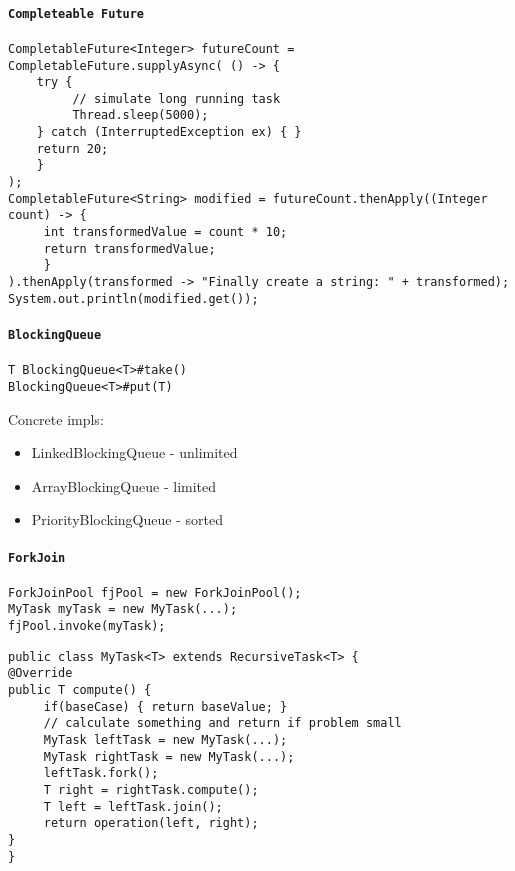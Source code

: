 \paragraph{\texttt{Completeable Future}}
\begin{verbatim}
CompletableFuture<Integer> futureCount = CompletableFuture.supplyAsync( () -> {
    try {
         // simulate long running task 
         Thread.sleep(5000);
    } catch (InterruptedException ex) { }
    return 20; 
    }
);
CompletableFuture<String> modified = futureCount.thenApply((Integer count) -> {
     int transformedValue = count * 10;
     return transformedValue; 
     }
).thenApply(transformed -> "Finally create a string: " + transformed);
System.out.println(modified.get());
\end{verbatim}


\paragraph{\texttt{BlockingQueue}}
\begin{verbatim}
T BlockingQueue<T>#take()
BlockingQueue<T>#put(T)
\end{verbatim}
Concrete impls:
\begin{itemize}
	\item LinkedBlockingQueue - unlimited
	\item ArrayBlockingQueue - limited
	\item PriorityBlockingQueue - sorted
\end{itemize}

\paragraph{\texttt{ForkJoin}}
\begin{verbatim}
ForkJoinPool fjPool = new ForkJoinPool();
MyTask myTask = new MyTask(...);
fjPool.invoke(myTask);
\end{verbatim}
\begin{verbatim}
public class MyTask<T> extends RecursiveTask<T> {
@Override
public T compute() {
     if(baseCase) { return baseValue; }
     // calculate something and return if problem small
     MyTask leftTask = new MyTask(...); 
     MyTask rightTask = new MyTask(...);
     leftTask.fork();
     T right = rightTask.compute();
     T left = leftTask.join();
     return operation(left, right);
}
}
\end{verbatim}
